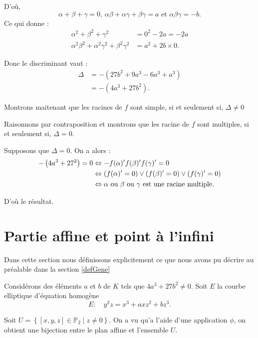 \begin{demonstration}[Lemme]
D'où,
\[
\alpha + \beta + \gamma = 0 \text{, } \alpha \beta + \alpha \gamma + \beta \gamma = a \text{ et } \alpha \beta \gamma = - b
.\] 
Ce qui donne : 
\begin{align*}
    \alpha^2 + \beta^2 + \gamma^2 &= 0^2 - 2a = -2a \\
    \alpha^2 \beta^2 + \alpha^2 \gamma^2 + \beta^2 \gamma^2 &= a^2 + 2b \times 0
.\end{align*}

Donc le discriminant vaut :
\begin{align*}
    \Delta &= - \left( 27b^2 + 9a^3 - 6a^3 + a^3  \right) \\
        &= - \left( 4a^3 + 27b^2  \right)
.\end{align*}

Montrons maitenant que les racines de $f$ sont simple, si et seulement si, $\Delta \neq 0$

Raisonnons par contraposition et montrons que les racine de $f$ sont multiples, si et
seulement si, $\Delta = 0$. 

Supposons que $\Delta = 0$. On a alors :
 \begin{align*}
     - \left( 4a^3 + 27^2 \right) = 0 &\Leftrightarrow - f(\alpha)' f(\beta )' f(\gamma)' = 0 \\
                                      & \Leftrightarrow \left( f(\alpha)' = 0 \right) \vee \left( f(\beta )' = 0 \right) \vee \left( f(\gamma)' = 0 \right) \\
                                      &\Leftrightarrow \alpha \text{ ou } \beta \text{ ou } \gamma \text{ est une racine multiple}
.\end{align*}

D'où le résultat.
\end{demonstration}

\section{Partie affine et point à l'infini}

Dans cette section nous définissons explicitement ce que nous avons pu décrire au préalable
dans la section \ref{defGene} 

Considérons des éléments $a$ et $b$ de $K$ tels que $4a^3+27b^2 \neq 0$. Soit $E$ la courbe
elliptique d'équation homogène
\[
E :\quad y^2z=x^3+axz^2+bz^3
.\] 

Soit $U = \left\{ [x,y,z] \in \mathbb{P}_{2} \mid z \neq 0 \right\} $. On a vu qu'a l'aide
d'une application $\phi$, on obtient une bijection entre le plan affine et l'ensemble $U$.

